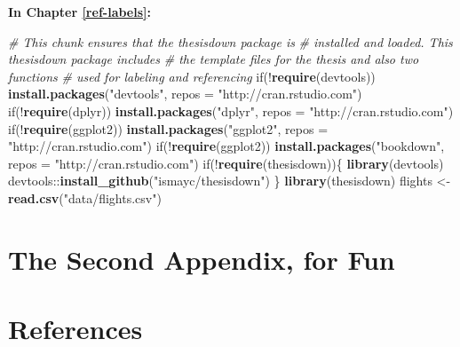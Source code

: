 \documentclass[12pt,twoside]{reedthesis}
\newenvironment{Shaded}{\begin{snugshade}}{\end{snugshade}}
\newcommand{\KeywordTok}[1]{\textcolor[rgb]{0.13,0.29,0.53}{\textbf{{#1}}}}
\newcommand{\DataTypeTok}[1]{\textcolor[rgb]{0.13,0.29,0.53}{{#1}}}
\newcommand{\StringTok}[1]{\textcolor[rgb]{0.31,0.60,0.02}{{#1}}}
\newcommand{\CommentTok}[1]{\textcolor[rgb]{0.56,0.35,0.01}{\textit{{#1}}}}
\newcommand{\NormalTok}[1]{{#1}}
\theoremstyle{definition}
\theoremstyle{definition}
\theoremstyle{definition}
\theoremstyle{remark}
\begin{document}
\textbf{In Chapter \ref{ref-labels}:}
\begin{Shaded}
\begin{Highlighting}[]
\CommentTok{# This chunk ensures that the thesisdown package is}
\CommentTok{# installed and loaded. This thesisdown package includes}
\CommentTok{# the template files for the thesis and also two functions}
\CommentTok{# used for labeling and referencing}
\NormalTok{if(!}\KeywordTok{require}\NormalTok{(devtools))}
  \KeywordTok{install.packages}\NormalTok{(}\StringTok{"devtools"}\NormalTok{, }\DataTypeTok{repos =} \StringTok{"http://cran.rstudio.com"}\NormalTok{)}
\NormalTok{if(!}\KeywordTok{require}\NormalTok{(dplyr))}
    \KeywordTok{install.packages}\NormalTok{(}\StringTok{"dplyr"}\NormalTok{, }\DataTypeTok{repos =} \StringTok{"http://cran.rstudio.com"}\NormalTok{)}
\NormalTok{if(!}\KeywordTok{require}\NormalTok{(ggplot2))}
    \KeywordTok{install.packages}\NormalTok{(}\StringTok{"ggplot2"}\NormalTok{, }\DataTypeTok{repos =} \StringTok{"http://cran.rstudio.com"}\NormalTok{)}
\NormalTok{if(!}\KeywordTok{require}\NormalTok{(ggplot2))}
    \KeywordTok{install.packages}\NormalTok{(}\StringTok{"bookdown"}\NormalTok{, }\DataTypeTok{repos =} \StringTok{"http://cran.rstudio.com"}\NormalTok{)}
\NormalTok{if(!}\KeywordTok{require}\NormalTok{(thesisdown))\{}
  \KeywordTok{library}\NormalTok{(devtools)}
  \NormalTok{devtools::}\KeywordTok{install_github}\NormalTok{(}\StringTok{"ismayc/thesisdown"}\NormalTok{)}
  \NormalTok{\}}
\KeywordTok{library}\NormalTok{(thesisdown)}
\NormalTok{flights <-}\StringTok{ }\KeywordTok{read.csv}\NormalTok{(}\StringTok{"data/flights.csv"}\NormalTok{)}
\end{Highlighting}
\end{Shaded}
\chapter{The Second Appendix, for
Fun}\label{the-second-appendix-for-fun}

\backmatter

\chapter*{References}\label{references}


\noindent

\setlength{\parindent}{-0.20in} \setlength{\leftskip}{0.20in}
\setlength{\parskip}{8pt}
\end{document}
